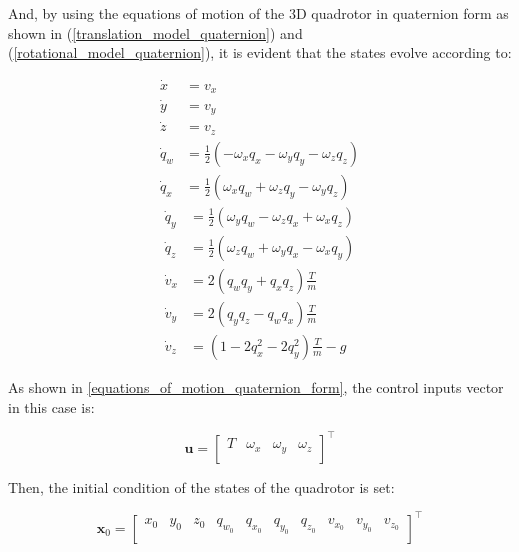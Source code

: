 \documentclass{thesisreport}
\begin{document}
And, by using the equations of motion of the 3D quadrotor in quaternion form as shown in (\ref{translation_model_quaternion}) and (\ref{rotational_model_quaternion}), it is evident that the states evolve according to: 

\begin{multicols}{2}
            \begin{align}
                \dot{x} &= v_x \\
                \dot{y} &= v_y \\
                \dot{z} &= v_z \\
                \dot{q}_w &=\frac{1}{2}( - \omega_x q_x - \omega_y q_y - \omega_z q_z) \\
                \dot{q}_x &=\frac{1}{2}( \omega_x q_w + \omega_z q_y - \omega_y q_z)
            \end{align}
        \columnbreak
            \begin{align}
                \dot{q}_y &=\frac{1}{2}( \omega_y q_w - \omega_z q_x + \omega_x q_z) \\
                \dot{q}_z &=\frac{1}{2}( \omega_z q_w + \omega_y q_x - \omega_x q_y) \\
                \dot{v}_x &= 2( q_w q_y + q_x q_z )\frac{T}{m} \\
                \dot{v}_y &= 2(q_y q_z - q_w q_x )\frac{T}{m} \\
                \dot{v}_z &= ( 1 - 2 q_x^2 - 2 q_y^2 )\frac{T}{m} - g
            \end{align}
\end{multicols}

\newpage

As shown in \ref{equations_of_motion_quaternion_form}, the control inputs vector in this case is: 

\begin{equation}
	\bm{u} = \begin{bmatrix}
		T & \omega_x & \omega_y & \omega_z \\
	\end{bmatrix}^{\intercal}
\end{equation}

Then, the initial condition of the states of the quadrotor is set:

\begin{equation}
	\bm{x}_0 = \begin{bmatrix}
		x_0 & y_0 & z_0 & q_{w_0} & q_{x_0} & q_{y_0} & q_{z_0} & v_{x_0} & v_{y_0} & v_{z_0}\\
	\end{bmatrix}^{\intercal}
\end{equation}
\end{document}
